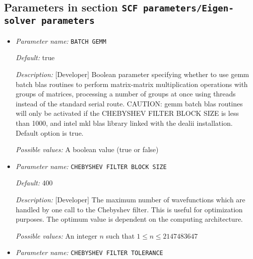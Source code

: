 \subsection{Parameters in section \tt SCF parameters/Eigen-solver parameters}
\label{parameters:SCF_20parameters/Eigen_2dsolver_20parameters}

\begin{itemize}
\item {\it Parameter name:} {\tt BATCH GEMM}
\label{parameters:SCF parameters/Eigen_2dsolver parameters/BATCH GEMM}
\label{parameters:SCF_20parameters/Eigen_2dsolver_20parameters/BATCH_20GEMM}




{\it Default:} true


{\it Description:} [Developer] Boolean parameter specifying whether to use gemm batch blas routines to perform matrix-matrix multiplication operations with groups of matrices, processing a number of groups at once using threads instead of the standard serial route. CAUTION: gemm batch blas routines will only be activated if the CHEBYSHEV FILTER BLOCK SIZE is less than 1000, and intel mkl blas library linked with the dealii installation. Default option is true.


{\it Possible values:} A boolean value (true or false)
\item {\it Parameter name:} {\tt CHEBYSHEV FILTER BLOCK SIZE}
\label{parameters:SCF parameters/Eigen_2dsolver parameters/CHEBYSHEV FILTER BLOCK SIZE}
\label{parameters:SCF_20parameters/Eigen_2dsolver_20parameters/CHEBYSHEV_20FILTER_20BLOCK_20SIZE}




{\it Default:} 400


{\it Description:} [Developer] The maximum number of wavefunctions which are handled by one call to the Chebyshev filter. This is useful for optimization purposes. The optimum value is dependent on the computing architecture.


{\it Possible values:} An integer $n$ such that $1\leq n \leq 2147483647$
\item {\it Parameter name:} {\tt CHEBYSHEV FILTER TOLERANCE}
\label{parameters:SCF parameters/Eigen_2dsolver parameters/CHEBYSHEV FILTER TOLERANCE}
\label{parameters:SCF_20parameters/Eigen_2dsolver_20parameters/CHEBYSHEV_20FILTER_20TOLERANCE}



\end{itemize}
